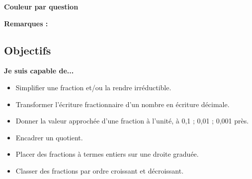 {\begin{spacing}{1.2}
		\vspace{0.3cm}
		\begin{center}
			\textbf{Couleur par question} \\[0.3cm]
			\drawQcircles
		\end{center}
		\vspace{0.3cm}

		\tcbline

		\textbf{Remarques : } \\

		\endtcolorbox
	\end{spacing}
}

\vfill
{ \small
	\tcolorbox[colframe=black, colback=white, boxrule=1pt, width=\textwidth]
	\subsection*{Objectifs}

	\textbf{Je suis capable de...}
	\begin{itemize}[label={\bfseries \checkboxEmpty}]
		\item Simplifier une fraction et/ou la rendre irréductible.
		\item Transformer l’écriture fractionnaire d’un nombre en écriture décimale.
		\item Donner la valeur approchée d’une fraction à l’unité, à 0,1 ; 0,01 ; 0,001 près.
		\item Encadrer un quotient.
		\item Placer des fractions à termes entiers sur une droite graduée.
		\item Classer des fractions par ordre croissant et décroissant.
	\end{itemize}

	\endtcolorbox
}
\vfill
